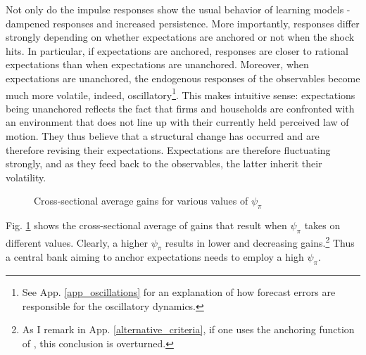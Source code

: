\documentclass[11pt]{article}
\def \myFigPath {../../figures/}
\renewcommand{\[}{\begin{equation}}
\renewcommand{\]}{\end{equation}}
\begin{document}
Not only do the impulse responses show the usual behavior of learning models - dampened responses and increased persistence. More importantly, responses differ strongly depending on whether expectations are anchored or not when the shock hits. In particular, if expectations are anchored, responses are closer to rational expectations than when expectations are unanchored. Moreover, when expectations are unanchored, the endogenous responses of the observables become much more volatile, indeed, oscillatory\footnote{See App. \ref{app_oscillations} for an explanation of how forecast errors are responsible for the oscillatory dynamics.}. This makes intuitive sense: expectations being unanchored reflects the fact that firms and households are confronted with an environment that does not line up with their currently held perceived law of motion. They thus believe that a structural change has occurred and are therefore revising their expectations. Expectations are therefore fluctuating strongly, and as they feed back to the observables, the latter inherit their volatility. 

\begin{figure}[h!]
\caption{Cross-sectional average gains for various values of $\psi_{\pi}$}
\label{anchor_psi}
\end{figure}


Fig. \ref{anchor_psi} shows the cross-sectional average of gains that result when $\psi_{\pi}$ takes on different values. Clearly, a higher $\psi_{\pi}$ results in lower and decreasing gains.\footnote{As I remark in App. \ref{alternative_criteria}, if one uses the anchoring function of \cite{carvalho2019anchored}, this conclusion is overturned.} Thus a central bank aiming to anchor expectations needs to employ a high $\psi_{\pi}$. 
\end{document}
